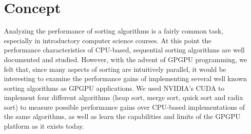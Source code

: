 \documentclass{article}
\begin{document}
\maketitle

\section{Concept}
Analyzing the performance of sorting algorithms is a fairly common task, especially in introductory computer science courses. At this point the performance characteristics of CPU-based, sequential sorting algorithms are well documented and studied. However, with the advent of GPGPU programming, we felt that, since many aspects of sorting are intuitively parallel, it would be interesting to examine the performance gains of implementing several well known sorting algorithms as GPGPU applications. We used NVIDIA's CUDA to implement four different algorithms (heap sort, merge sort, quick sort and radix sort) to measure possible performance gains over CPU-based implementations of the same algorithms, as well as learn the capabilities and limits of the GPGPU platform as it exists today.
\end{document}
